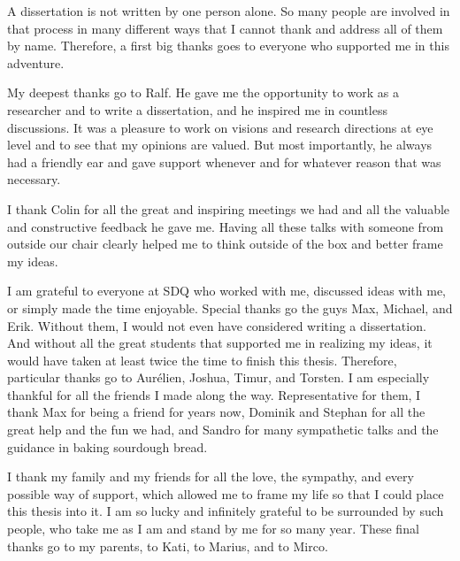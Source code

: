 A dissertation is not written by one person alone.
So many people are involved in that process in many different ways that I cannot thank and address all of them by name.
Therefore, a first big thanks goes to everyone who supported me in this adventure.

My deepest thanks go to Ralf.
He gave me the opportunity to work as a researcher and to write a dissertation, and he inspired me in countless discussions. It was a pleasure to work on visions and research directions at eye level and to see that my opinions are valued.
But most importantly, he always had a friendly ear and gave support whenever and for whatever reason that was necessary. 

I thank Colin for all the great and inspiring meetings we had and all the valuable and constructive feedback he gave me. Having all these talks with someone from outside our chair clearly helped me to think outside of the box and better frame my ideas.

I am grateful to everyone at SDQ who worked with me, discussed ideas with me, or simply made the time enjoyable.
Special thanks go the \vitruvius guys Max, Michael, and Erik. Without them, I would not even have considered writing a dissertation.
And without all the great students that supported me in realizing my ideas, it would have taken at least twice the time to finish this thesis. 
Therefore, particular thanks go to Aurélien, Joshua, Timur, and Torsten.
I am especially thankful for all the friends I made along the way. Representative for them, I thank Max for being a friend for years now, Dominik and Stephan for all the great help and the fun we had, and Sandro for many sympathetic talks and the guidance in baking sourdough bread.

I thank my family and my friends for all the love, the sympathy, and every possible way of support, which allowed me to frame my life so that I could place this thesis into it.
I am so lucky and infinitely grateful to be surrounded by such people, who take me as I am and stand by me for so many year.
These final thanks go to my parents, to Kati, to Marius, and to Mirco.
